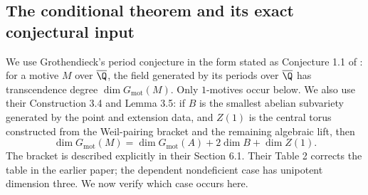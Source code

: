 \subsection{The conditional theorem and its exact conjectural input}

We use Grothendieck's period conjecture in the form stated as
Conjecture 1.1 of \citet{bertolin2022}: for a motive $M$ over
$\overline\Q$, the field generated by its periods over
$\overline\Q$ has transcendence degree $\dim G_{\mathrm{mot}}(M)$.
Only $1$-motives occur below. We also use their Construction 3.4
and Lemma 3.5: if $B$ is the smallest abelian subvariety
generated by the point and extension data, and $Z(1)$ is the
central torus constructed from the Weil-pairing bracket and
the remaining algebraic lift, then
\begin{equation}\label{ari:eq:cp-MTdim}
 \dim G_{\mathrm{mot}}(M)
 =\dim G_{\mathrm{mot}}(A)+2\dim B+\dim Z(1).
\end{equation}
The bracket is described explicitly in their Section 6.1.
Their Table 2 corrects the table in the earlier paper; the
dependent nondeficient case has unipotent dimension three.
We now verify which case occurs here.

